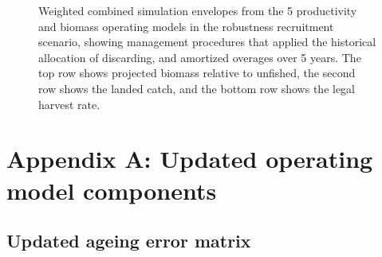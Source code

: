 \documentclass[11pt]{book}
\begin{document}
\begin{landscape}
\begin{figure}[htb]
{\centering {} 

}

\caption{Weighted combined simulation envelopes from the 5 productivity and biomass operating models in the robustness recruitment scenario, showing management procedures that applied the historical allocation of discarding, and amortized overages over 5 years. The top row shows projected biomass relative to unfished, the second row shows the landed catch, and the bottom row shows the legal harvest rate.}\label{fig:unnamed-chunk-25}
\end{figure}
\end{landscape}
\hypertarget{appendix-appendices}{%
\appendix}


\hypertarget{appendix-a-updated-operating-model-components}{%
\section{Appendix A: Updated operating model components}\label{appendix-a-updated-operating-model-components}}

\setcounter{table}{0}\setcounter{figure}{0}

\hypertarget{updated-ageing-error-matrix}{%
\subsection{Updated ageing error matrix}\label{updated-ageing-error-matrix}}
\end{document}
